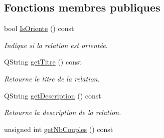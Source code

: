 \subsection*{Fonctions membres publiques}
\begin{DoxyCompactItemize}
\item 
\hypertarget{class_relation_aae327a3e3ea72e99a60933ef082f5810}{bool \hyperlink{class_relation_aae327a3e3ea72e99a60933ef082f5810}{Is\-Oriente} () const }\label{class_relation_aae327a3e3ea72e99a60933ef082f5810}

\begin{DoxyCompactList}\small\item\em Indique si la relation est orientée. \end{DoxyCompactList}\item 
\hypertarget{class_relation_a6f13798adcf5ad202bc1870c73a771ec}{Q\-String \hyperlink{class_relation_a6f13798adcf5ad202bc1870c73a771ec}{get\-Titre} () const }\label{class_relation_a6f13798adcf5ad202bc1870c73a771ec}

\begin{DoxyCompactList}\small\item\em Retourne le titre de la relation. \end{DoxyCompactList}\item 
\hypertarget{class_relation_ad70081c491ac168bc2c5a1afae81190b}{Q\-String \hyperlink{class_relation_ad70081c491ac168bc2c5a1afae81190b}{get\-Description} () const }\label{class_relation_ad70081c491ac168bc2c5a1afae81190b}

\begin{DoxyCompactList}\small\item\em Retourne la description de la relation. \end{DoxyCompactList}\item 
\hypertarget{class_relation_a2f1b599fe52f33a5caa3f76838bdc81b}{unsigned int \hyperlink{class_relation_a2f1b599fe52f33a5caa3f76838bdc81b}{get\-Nb\-Couples} () const }\label{class_relation_a2f1b599fe52f33a5caa3f76838bdc81b}


\end{DoxyCompactItemize}
